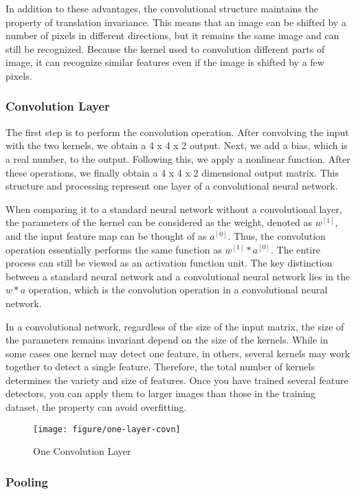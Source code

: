 \documentclass{article}
\begin{document}
In addition to these advantages, the convolutional structure maintains the property of translation invariance. This means that an image can be shifted by a number of pixels in different directions, but it remains the same image and can still be recognized. Because the kernel used to convolution different parts of image, it can recognize similar features even if the image is shifted by a few pixels.


\newpage
\subsubsection{Convolution Layer}
The first step is to perform the convolution operation. After convolving the input with the two kernels, we obtain a 4 x 4 x 2 output. Next, we add a bias, which is a real number, to the output. Following this, we apply a nonlinear function. After these operations, we finally obtain a 4 x 4 x 2 dimensional output matrix. This structure and processing represent one layer of a convolutional neural network.

When comparing it to a standard neural network without a convolutional layer, the parameters of the kernel can be considered as the weight, denoted as $w^{[1]}$, and the input feature map can be thought of as $a^{[0]}$. Thus, the convolution operation essentially performs the same function as $w^{[1]} * a^{[0]}$. The entire process can still be viewed as an activation function unit. The key distinction between a standard neural network and a convolutional neural network lies in the $w * a$ operation, which is the convolution operation in a convolutional neural network.

In a convolutional network, regardless of the size of the input matrix, the size of the parameters remains invariant depend on the size of the kernels. While in some cases one kernel may detect one feature, in others, several kernels may work together to detect a single feature. Therefore, the total number of kernels determines the variety and size of features. Once you have trained several feature detectors, you can apply them to larger images than those in the training dataset, the property can avoid overfitting.

\begin{figure}[htbp]
        \centering
        \texttt{[image: figure/one-layer-covn]}
        \caption{One Convolution Layer}
     \end{figure}


\newpage
\subsubsection{Pooling}
\end{document}
